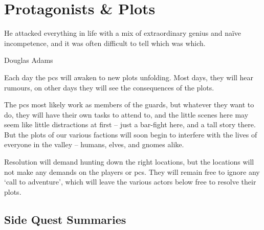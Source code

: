 \chapter{Protagonists \& Plots}
  \epigraph{He attacked everything in life with a mix of extraordinary genius and na\"ive incompetence, and it was often difficult to tell which was which.}{Douglas Adams}
\label{sideQuestIntro}

\noindent
Each day the \glspl{pc} will awaken to new plots unfolding.
Most days, they will hear rumours, on other days they will see the consequences of the plots.

The \glspl{pc} most likely work as members of the \glspl{guard}, but whatever they want to do, they will have their own tasks to attend to, and the little scenes here may seem like little distractions at first -- just a bar-fight here, and a tall story there.
But the plots of our various factions will soon begin to interfere with the lives of everyone in the \gls{valley} -- humans, elves, and gnomes alike.

Resolution will demand hunting down the right locations, but the locations will not make any demands on the players or \glspl{pc}.
They will remain free to ignore any `call to adventure', which will leave the various actors below free to resolve their plots.


\printglossary[
  type=people,
  style=mcolindex,
]

\label{Irina/greylands}

\section{Side Quest Summaries}
\label{sqSummaries}

